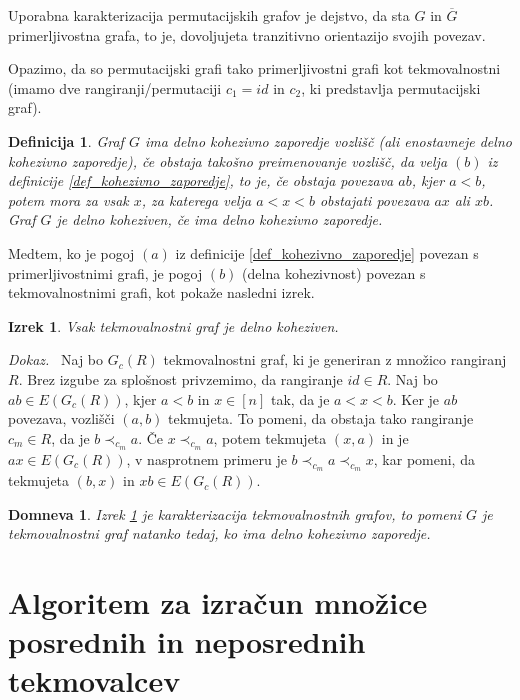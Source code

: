 \documentclass[a4paper, 12pt]{book}
\newtheorem{definicija}{Definicija}[chapter]
\newtheorem{izrek}{Izrek}[chapter]
\newtheorem{domneva}{Domneva}[chapter]
\newenvironment{dokaz}{\emph{Dokaz.}\ }{\hspace{\fill}{$\Box$}}
\begin{document}
Uporabna karakterizacija permutacijskih grafov je dejstvo, da sta $G$ in $\overline{G}$ primerljivostna grafa, to je, dovoljujeta tranzitivno orientazijo svojih povezav. 

Opazimo, da so permutacijski grafi tako primerljivostni grafi kot tekmovalnostni (imamo dve rangiranji/permutaciji $c_1 = id$ in $c_2$, ki predstavlja permutacijski graf).

\begin{definicija}
    Graf $G$ ima delno kohezivno zaporedje vozlišč (ali enostavneje delno kohezivno zaporedje), če obstaja takošno preimenovanje vozlišč, da velja $(b)$ iz definicije \ref{def_kohezivno_zaporedje}, to je, če obstaja povezava $ab$, kjer $a < b$, potem mora za vsak $x$, za katerega velja $a < x < b$ obstajati povezava $ax$ ali $xb$. Graf $G$ je delno koheziven, če ima delno kohezivno zaporedje.
\end{definicija}

Medtem, ko je pogoj $(a)$ iz definicije \ref{def_kohezivno_zaporedje} povezan s primerljivostnimi grafi, je pogoj $(b)$ (delna kohezivnost) povezan s tekmovalnostnimi grafi, kot pokaže nasledni izrek.

\begin{izrek}
\label{tekmovalnosni_graf_delno_koheziven}
    Vsak tekmovalnostni graf je delno koheziven.
\end{izrek}
\begin{dokaz}
    Naj bo $G_c(R)$ tekmovalnostni graf, ki je generiran z množico rangiranj $R$. Brez izgube za splošnost privzemimo, da rangiranje $id \in R$. Naj bo $ab \in E(G_c(R))$, kjer $a < b$ in $x \in [n]$ tak, da je $a < x < b$. Ker je $ab$ povezava, vozlišči $(a, b)$ tekmujeta. To pomeni, da obstaja tako rangiranje $c_m \in R$, da je $b \prec_{c_m} a$. Če $x \prec_{c_m} a$, potem tekmujeta $(x, a)$ in je $ax \in E(G_c(R))$, v nasprotnem primeru je $b \prec_{c_m} a \prec_{c_m} x$, kar pomeni, da tekmujeta $(b, x)$ in $xb \in E(G_c(R))$.
\end{dokaz}

\begin{domneva}
    Izrek \ref{tekmovalnosni_graf_delno_koheziven} je karakterizacija tekmovalnostnih grafov, to pomeni $G$ je tekmovalnostni graf natanko tedaj, ko ima delno kohezivno zaporedje.
\end{domneva}

\chapter{ Algoritem za izračun množice posrednih in neposrednih tekmovalcev }
\end{document}
